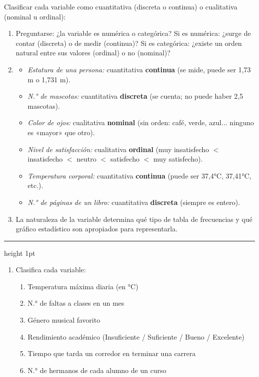 \documentclass[11pt, letterpaper]{article}
\newcommand{\subbloque}[1]{%
  \vspace{14pt}
  \noindent{\large\bfseries\color{zenitnavy} #1}\par
  \vspace{4pt}\hrule height 1pt\vspace{8pt}}
\begin{document}
\begin{tcolorbox}[examplebox, title={Ej. 2. Clasificar variables}]
Clasificar cada variable como cuantitativa (discreta o continua) o cualitativa (nominal u ordinal):

\begin{enumerate}[label=\textbf{\arabic*.}, leftmargin=2.8cm]
  \item[\textbf{Criterio.}] Preguntarse: ¿la variable es numérica o categórica? Si es numérica: ¿surge de contar (discreta) o de medir (continua)?  Si es categórica: ¿existe un orden natural entre sus valores (ordinal) o no (nominal)?

  \medskip
  \item[\textbf{Resultados.}]
  \begin{itemize}
    \item \textit{Estatura de una persona:} cuantitativa \textbf{continua} (se mide, puede ser 1{,}73 m o 1{,}731 m).
    \item \textit{N.° de mascotas:} cuantitativa \textbf{discreta} (se cuenta; no puede haber 2{,}5 mascotas).
    \item \textit{Color de ojos:} cualitativa \textbf{nominal} (sin orden: café, verde, azul... ninguno es «mayor» que otro).
    \item \textit{Nivel de satisfacción:} cualitativa \textbf{ordinal} (muy insatisfecho $<$ insatisfecho $<$ neutro $<$ satisfecho $<$ muy satisfecho).
    \item \textit{Temperatura corporal:} cuantitativa \textbf{continua} (puede ser 37{,}4°C, 37{,}41°C, etc.).
    \item \textit{N.° de páginas de un libro:} cuantitativa \textbf{discreta} (siempre es entero).
  \end{itemize}

  \medskip
  \item[\textbf{Conclusión.}] La naturaleza de la variable determina qué tipo de tabla de frecuencias y qué gráfico estadístico son apropiados para representarla.
\end{enumerate}
\end{tcolorbox}

\subbloque{Práctica inmediata 1.2}

\begin{enumerate}[label=\textbf{\arabic*.}, leftmargin=*]
  \item Clasifica cada variable:
  \begin{enumerate}[label=\alph*)]
    \item Temperatura máxima diaria (en °C)
    \item N.° de faltas a clases en un mes
    \item Género musical favorito
    \item Rendimiento académico (Insuficiente / Suficiente / Bueno / Excelente)
    \item Tiempo que tarda un corredor en terminar una carrera
    \item N.° de hermanos de cada alumno de un curso
  \end{enumerate}
\end{enumerate}
\end{document}
